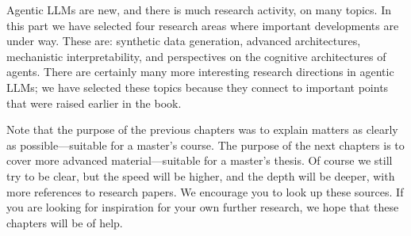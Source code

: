 Agentic LLMs are new, and there is much research activity, on many topics. In this part we have selected four  research areas where important developments are under way. These are: synthetic data generation, advanced architectures, mechanistic interpretability, and perspectives on the cognitive architectures of agents. There are certainly many more interesting research directions in agentic LLMs; we have selected  these  topics because they connect to important points that were raised earlier in the book. 

Note that the purpose of the previous chapters was to explain matters as clearly as possible---suitable for a master's course. The purpose of the next chapters is to cover more advanced material---suitable for a master's thesis. Of course we still try to be clear, but the speed will be higher, and the depth will be deeper, with more references to research papers. We encourage you to look up these sources. If you are looking for inspiration for your own further research, we hope that these chapters will be of help.
